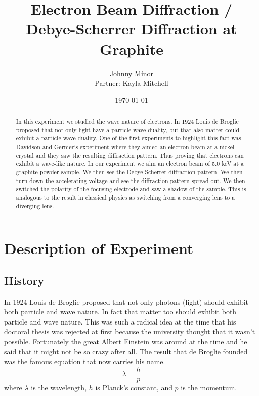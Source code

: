 \documentclass[12pt letterpaper]{article}
\title{Electron Beam Diffraction / Debye-Scherrer Diffraction at Graphite}
\author{Johnny Minor \\ Partner: Kayla Mitchell}
\date{\today}
\begin{document}
\maketitle

\begin{abstract}
In this experiment we studied the wave nature of electrons. In 1924 Louis de Broglie proposed that not only light have a particle-wave duality, but that also matter could exhibit a particle-wave duality. One of the first experiments to highlight this fact was Davidson and Germer's experiment where they aimed an electron beam at a nickel crystal and they saw the resulting diffraction pattern. Thus proving that electrons can exhibit a wave-like nature. In our experiment we aim an electron beam of 5.0 keV at a graphite powder sample. We then see the Debye-Scherrer diffraction pattern. We then turn down the accelerating voltage and see the diffraction pattern spread out. We then switched the polarity of the focusing electrode and saw a shadow of the sample. This is analogous to the result in classical physics as switching from a  converging lens to a diverging lens. 

 
\end{abstract}

\newpage

\section*{Description of Experiment}

\subsection*{History}

In 1924 Louis de Broglie proposed that not only photons (light) should exhibit both particle and wave nature. In fact that matter too should exhibit both particle and wave nature. This was such a radical idea at the time that his doctoral thesis was rejected at first because the university thought that it wasn't possible. Fortunately the great Albert Einstein was around at the time and he said that it might not be so crazy after all. The result that de Broglie founded was the famous equation that now carries his name. 
\begin{equation}
\label{eq:debroglie}
\lambda = \frac{h}{p}
\end{equation}
where $\lambda$ is the wavelength, $h$ is Planck's constant, and $p$ is the momentum. 
\end{document}
